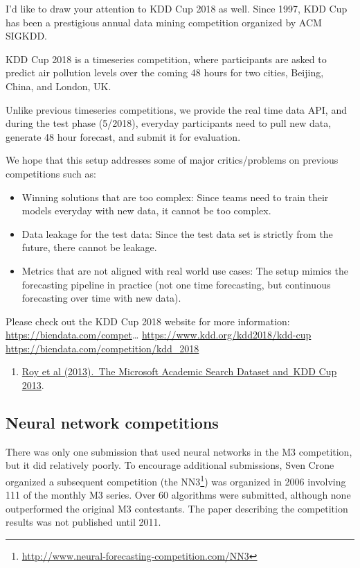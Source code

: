 \documentclass[11pt,a4paper,]{article}
\providecommand{\tightlist}{%
  \setlength{\itemsep}{0pt}\setlength{\parskip}{0pt}}
\begin{document}
I'd like to draw your attention to KDD Cup 2018 as well. Since 1997, KDD Cup has been a prestigious annual data mining competition organized by ACM SIGKDD.

KDD Cup 2018 is a timeseries competition, where participants are asked to predict air pollution levels over the coming 48 hours for two cities, Beijing, China, and London, UK.

Unlike previous timeseries competitions, we provide the real time data API, and during the test phase (5/2018), everyday participants need to pull new data, generate 48 hour forecast, and submit it for evaluation.

We hope that this setup addresses some of major critics/problems on previous competitions such as:

\begin{itemize}
\tightlist
\item
  Winning solutions that are too complex: Since teams need to train their models everyday with new data, it cannot be too complex.
\item
  Data leakage for the test data: Since the test data set is strictly from the future, there cannot be leakage.
\item
  Metrics that are not aligned with real world use cases: The setup mimics the forecasting pipeline in practice (not one time forecasting, but continuous forecasting over time with new data).
\end{itemize}

Please check out the KDD Cup 2018 website for more information: \url{https://biendata.com/compet}\ldots{}
\url{https://www.kdd.org/kdd2018/kdd-cup}
\url{https://biendata.com/competition/kdd_2018}

\begin{enumerate}
\def\labelenumi{\arabic{enumi}.}
\setcounter{enumi}{1}
\tightlist
\item
  \href{http://www.kdd.org/kddcup2013/sites/default/files/papers/papers.pdf}{Roy et al (2013).~The Microsoft Academic Search Dataset and~KDD Cup 2013}.
\end{enumerate}

\hypertarget{neural-network-competitions}{%
\subsection*{Neural network competitions}\label{neural-network-competitions}}

There was only one submission that used neural networks in the M3 competition, but it did relatively poorly. To encourage additional submissions, Sven Crone organized a subsequent competition (the NN3\footnote{\url{http://www.neural-forecasting-competition.com/NN3}}) was organized in 2006 involving 111 of the monthly M3 series. Over 60 algorithms were submitted, although none outperformed the original M3 contestants. The paper describing the competition results \autocite{NN3} was not published until 2011.
\end{document}
